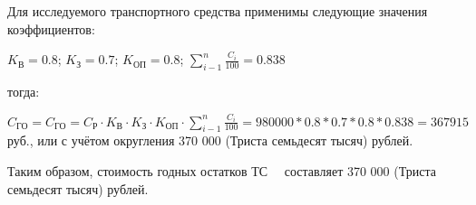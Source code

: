  \par
 
 
 Для исследуемого транспортного средства применимы следующие значения коэффициентов:\par
 $ K_{\text{В}} =0.8  $; 
 $ K_{\text{З}} =0.7 $; 
 $ K_{\text{ОП}} =0.8 $; $ \sum\limits_{i-1}^{n}\frac{C_i}{100} = 0.838 $ \par тогда:
 \par
$  C_{\text{ГО}} =  C_{\text{ГО}}= C_{\text{Р}} \cdot K_{\text{В}}\cdot K_{\text{З}}\cdot K_{\text{ОП}} \cdot  \sum\limits_{i-1}^{n}\frac{C_i}{100} =980000*0.8*0.7*0.8*0.838 = 367915 $ руб., или с учётом округления 370 000 (Триста семьдесят тысяч) рублей.
\par Таким образом, стоимость годных остатков ТС  \, \, составляет 370 000 (Триста семьдесят тысяч) рублей.

